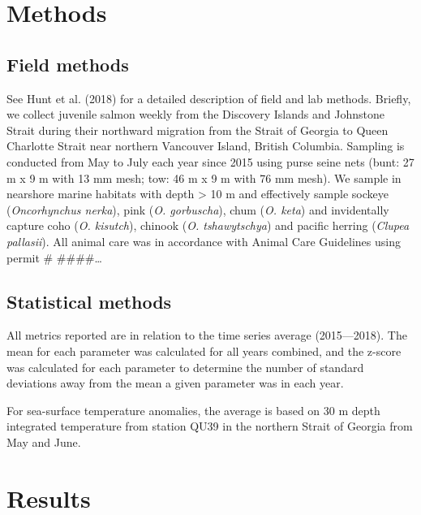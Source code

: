 \documentclass[fleqn,10pt]{wlpeerj} %
\begin{document}
\section*{Methods}\label{methods}

\subsection*{Field methods}\label{field-methods}

See Hunt et al. (2018) for a detailed description of field and lab
methods. Briefly, we collect juvenile salmon weekly from the Discovery
Islands and Johnstone Strait during their northward migration from the
Strait of Georgia to Queen Charlotte Strait near northern Vancouver
Island, British Columbia. Sampling is conducted from May to July each
year since 2015 using purse seine nets (bunt: 27 m x 9 m with 13 mm
mesh; tow: 46 m x 9 m with 76 mm mesh). We sample in nearshore marine
habitats with depth \textgreater{} 10 m and effectively sample sockeye
(\emph{Oncorhynchus nerka}), pink (\emph{O. gorbuscha}), chum (\emph{O.
keta}) and invidentally capture coho (\emph{O. kisutch}), chinook
(\emph{O. tshawytschya}) and pacific herring (\emph{Clupea pallasii}).
All animal care was in accordance with Animal Care Guidelines using
permit \# \#\#\#\#\ldots{}

\subsection*{Statistical methods}\label{statistical-methods}

All metrics reported are in relation to the time series average
(2015---2018). The mean for each parameter was calculated for all years
combined, and the z-score was calculated for each parameter to determine
the number of standard deviations away from the mean a given parameter
was in each year.

For sea-surface temperature anomalies, the average is based on 30 m
depth integrated temperature from station QU39 in the northern Strait of
Georgia from May and June.

\section*{Results}\label{results}
\end{document}
